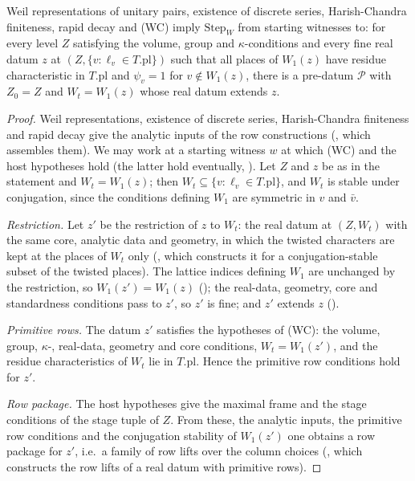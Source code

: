 \begin{lemma}\label{pf:bundles:lem:start}
Weil representations of unitary pairs, existence of discrete series, Harish-Chandra finiteness, rapid decay and (WC) imply $\mathrm{Step}_W$
from starting witnesses to: for every level $Z$ satisfying the volume, group and $\kappa$-conditions and every fine real datum $z$ at
$(Z,\{v:\ell_v\in T.\mathrm{pl}\})$ such that all places of $W_1(z)$ have residue characteristic in $T.\mathrm{pl}$ and $\psi_v=1$ for
$v\notin W_1(z)$, there is a pre-datum $\mathcal P$ with $Z_0=Z$ and $W_t=W_1(z)$ whose real datum extends $z$.
\end{lemma}

\begin{proof}
Weil representations, existence of discrete series, Harish-Chandra finiteness and rapid decay give the analytic inputs of the row
constructions (, which assembles them). We may work at a starting witness $w$ at which
(WC) and the host hypotheses hold (the latter hold eventually, ). Let $Z$ and $z$ be as
in the statement and $W_t=W_1(z)$; then $W_t\subseteq\{v:\ell_v\in T.\mathrm{pl}\}$, and $W_t$ is stable under conjugation, since the conditions
defining $W_1$ are symmetric in $v$ and $\bar v$.

\emph{Restriction.} Let $z'$ be the restriction of $z$ to $W_t$: the real datum at $(Z,W_t)$ with the same core, analytic data and geometry, in
which the twisted characters are kept at the places of $W_t$ only (, which constructs it for a
conjugation-stable subset of the twisted places). The lattice indices defining $W_1$ are unchanged by the restriction, so $W_1(z')=W_1(z)$
(); the real-data, geometry, core and standardness
conditions pass to $z'$, so $z'$ is fine; and $z'$ extends $z$ ().

\emph{Primitive rows.} The datum $z'$ satisfies the hypotheses of (WC): the volume, group, $\kappa$-, real-data, geometry and core conditions,
$W_t=W_1(z')$, and the residue characteristics of $W_t$ lie in $T.\mathrm{pl}$. Hence the primitive row conditions hold for $z'$.

\emph{Row package.} The host hypotheses give the maximal frame and the stage conditions of the stage tuple of $Z$. From these, the analytic inputs,
the primitive row conditions and the conjugation stability of $W_1(z')$ one obtains a row package for $z'$, i.e.\ a family of row lifts over the
column choices (, which constructs the row lifts of a real datum with primitive
rows).


\end{proof}
